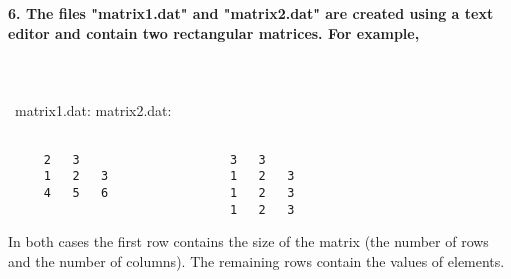 \documentclass{article}
\begin{document}
\paragraph{}\
\paragraph{}\
\paragraph{}\
\paragraph{}\
\paragraph{}\
\paragraph{}\
\paragraph{}\
\paragraph{}\
\paragraph{}\
\paragraph{}\

\paragraph{6. The files "matrix1.dat" and "matrix2.dat" are created using a text editor and contain two rectangular matrices. For example, }\
\paragraph{}\
\quad matrix1.dat:		\qquad \qquad \qquad \qquad matrix2.dat:
\begin{verbatim}

     2   3                     3   3
     1   2   3                 1   2   3
     4   5   6                 1   2   3
                               1   2   3
\end{verbatim}
In both cases the first row contains the size of the matrix (the number of rows and the number of columns). The remaining rows contain the values of elements.
\end{document}
